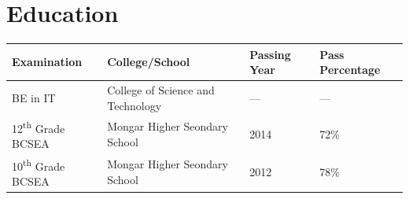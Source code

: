 \documentclass[10pt]{article}
\begin{document}
	\section{Education}
	\begin{center}  
		\begin{tabular}{ | l | l | l | l |}
			\hline
			\textbf{Examination} & \textbf{College/School}  & \textbf{Passing Year} & \textbf{Pass Percentage}\\ \hline
			BE in IT &College of Science and Technology &---\- & ---\-\\ \hline
			12\textsuperscript{th} Grade BCSEA & Mongar Higher Seondary School & 2014 & 72\% \\ \hline
			10\textsuperscript{th} Grade BCSEA & Mongar Higher Seondary School & 2012 & 78\% \\ \hline
		\end{tabular}
	\end{center}
 
\end{document}
